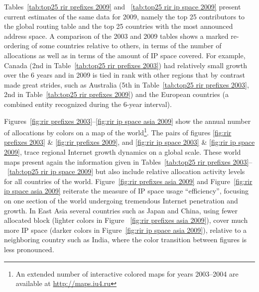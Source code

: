 Tables~\ref{tab:top25 rir prefixes 2009} and ~\ref{tab:top25 rir ip space 2009}
present current estimates of the same data for 2009, namely the top 25
contributors to the global routing table and the top 25 countries with the most
announced address space. A comparison of the 2003 and 2009 tables shows a
marked re-ordering of some countries relative to others, in terms of the number
of allocations as well as in terms of the amount of IP space covered. For
example, Canada (2nd in Table~\ref{tab:top25 rir prefixes 2003}) had relatively
small growth over the 6 years and in 2009 is tied in rank with other regions
that by contrast made great strides, such as Australia (5th in
Table~\ref{tab:top25 rir prefixes 2003}, 2nd in Table~\ref{tab:top25 rir
prefixes 2009}) and the European countries (a combined entity recognized during
the 6-year interval).

Figures~\ref{fig:rir prefixes 2003}--\ref{fig:rir ip space asia 2009} show the
annual number of allocations by colors on a map of the world\footnote{%
An extended number of interactive colored maps for years 2003--2004 are
available at \url{http://maps.iu4.ru}}. The pairs of figures \ref{fig:rir
prefixes 2003} \& \ref{fig:rir prefixes 2009}, and \ref{fig:rir ip space 2003}
\& \ref{fig:rir ip space 2009}, trace regional Internet growth dynamics on a
global scale. These world maps present again the information given in
Tables~\ref{tab:top25 rir prefixes 2003}--~\ref{tab:top25 rir ip space 2009}
but also include relative allocation activity levels for all countries of the
world. Figure~\ref{fig:rir prefixes asia 2009} and Figure~\ref{fig:rir ip space
asia 2009} reiterate the measure of IP space usage ``efficiency'', focusing on
one section of the world undergoing tremendous Internet penetration and growth.
In East Asia several countries such as Japan and China, using fewer allocated
block (lighter colors in Figure ~\ref{fig:rir prefixes asia 2009}), cover much
more IP space (darker colors in Figure~\ref{fig:rir ip space asia 2009}),
relative to a neighboring country such as India, where the color transition
between figures is less pronounced.
